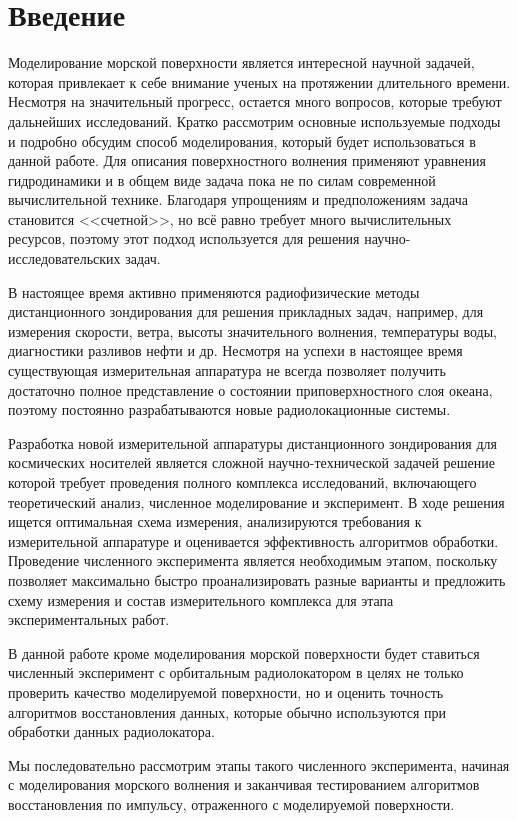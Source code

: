 
\section{Введение}%
\label{sec:vvedenie}

Моделирование морской поверхности является интересной научной задачей, которая
привлекает к себе внимание ученых на протяжении длительного времени.
Несмотря на значительный прогресс, остается много вопросов, которые требуют
дальнейших исследований. Кратко рассмотрим основные используемые подходы и
подробно обсудим способ моделирования, который будет использоваться в данной
работе.  Для описания поверхностного волнения применяют уравнения гидродинамики
и в общем виде задача пока не по силам современной вычислительной технике.
Благодаря упрощениям и предположениям задача становится <<счетной>>, но всё
равно требует много вычислительных ресурсов, поэтому этот подход используется для
решения научно-исследовательских задач. 

В настоящее время активно применяются радиофизические методы дистанционного
зондирования для
решения прикладных задач, например, для измерения скорости, ветра, высоты
значительного волнения, температуры воды, диагностики разливов нефти и др. 
Несмотря на успехи в настоящее время существующая измерительная аппаратура не
всегда позволяет получить достаточно полное представление о состоянии
приповерхностного слоя океана, поэтому постоянно разрабатываются новые
радиолокационные системы.

Разработка новой измерительной аппаратуры дистанционного зондирования для
космических носителей является сложной научно-технической задачей решение
которой требует проведения полного комплекса исследований, включающего
теоретический анализ, численное моделирование и эксперимент. В ходе решения
ищется оптимальная схема измерения, анализируются требования к измерительной
аппаратуре и оценивается эффективность алгоритмов обработки. Проведение
численного эксперимента является необходимым этапом, поскольку  позволяет максимально быстро проанализировать разные варианты и предложить схему измерения и состав измерительного комплекса для этапа экспериментальных работ.

В данной работе кроме моделирования морской поверхности будет ставиться
численный эксперимент с орбитальным радиолокатором в целях не только проверить
качество моделируемой поверхности, но и оценить точность алгоритмов
восстановления данных, которые обычно используются при обработки данных
радиолокатора.  

Мы последовательно рассмотрим этапы такого численного эксперимента, начиная  с
моделирования морского волнения и заканчивая тестированием алгоритмов
восстановления по импульсу, отраженного с моделируемой поверхности.

